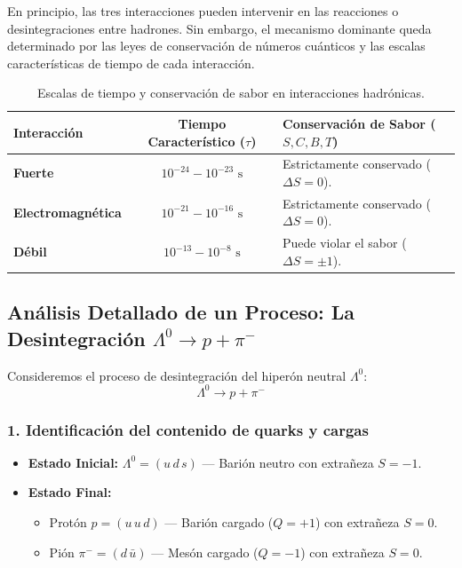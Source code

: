 En principio, las tres interacciones pueden intervenir en las reacciones o desintegraciones entre hadrones. Sin embargo, el mecanismo dominante queda determinado por las leyes de conservación de números cuánticos y las escalas características de tiempo de cada interacción.

\begin{table}[h!]
\centering
\caption{Escalas de tiempo y conservación de sabor en interacciones hadrónicas.}
\label{tab:interacciones_tiempos}
\vspace{0.2cm}
\small
\begin{tabularx}{\linewidth}{l c X}
\toprule
\textbf{Interacción} & \textbf{Tiempo Característico ($\tau$)} & \textbf{Conservación de Sabor ($S, C, B, T$)} \\
\midrule
\textbf{Fuerte} & $10^{-24} - 10^{-23} \text{ s}$ & Estrictamente conservado ($\Delta S = 0$). \\
\textbf{Electromagnética} & $10^{-21} - 10^{-16} \text{ s}$ & Estrictamente conservado ($\Delta S = 0$). \\
\textbf{Débil} & $10^{-13} - 10^{-8} \text{ s}$ & Puede violar el sabor ($\Delta S = \pm 1$). \\
\bottomrule
\end{tabularx}
\end{table}

\newpage
\subsection{Análisis Detallado de un Proceso: La Desintegración \texorpdfstring{$\Lambda^0 \to p + \pi^-$}{Lambda0 -> p + pi-}}

Consideremos el proceso de desintegración del hiperón neutral $\Lambda^0$:
\begin{equation}
\label{eq:lambda_decay}
\Lambda^0 \longrightarrow p + \pi^-
\end{equation}

\subsubsection*{1. Identificación del contenido de quarks y cargas}
\begin{itemize}
    \item \textbf{Estado Inicial:} $\Lambda^0 = (u\,d\,s)$ --- Barión neutro con extrañeza $S = -1$.
    \item \textbf{Estado Final:} 
    \begin{itemize}
        \item Protón $p = (u\,u\,d)$ --- Barión cargado ($Q = +1$) con extrañeza $S = 0$.
        \item Pión $\pi^- = (d\,\bar{u})$ --- Mesón cargado ($Q = -1$) con extrañeza $S = 0$.
    \end{itemize}
\end{itemize}

